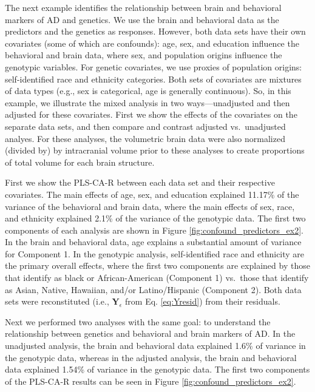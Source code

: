 \documentclass[12pt]{article}
\begin{document}
The next example identifies the relationship between brain and
behavioral markers of AD and genetics. We use the brain and behavioral
data as the predictors and the genetics as responses. However, both data
sets have their own covariates (some of which are confounds): age, sex,
and education influence the behavioral and brain data, where sex, and
population origins influence the genotypic variables. For genetic
covariates, we use proxies of population origins: self-identified race
and ethnicity categories. Both sets of covariates are mixtures of data
types (e.g., sex is categorical, age is generally continuous). So, in
this example, we illustrate the mixed analysis in two ways---unadjusted
and then adjusted for these covariates. First we show the effects of the
covariates on the separate data sets, and then compare and contrast
adjusted vs.~unadjusted analyes. For these analyses, the volumetric
brain data were also normalized (divided by) by intracranial volume
prior to these analyses to create proportions of total volume for each
brain structure.

First we show the PLS-CA-R between each data set and their respective
covariates. The main effects of age, sex, and education explained
11.17\% of the variance of the behavioral and brain data, where the main
effects of sex, race, and ethnicity explained 2.1\% of the variance of
the genotypic data. The first two components of each analysis are shown
in Figure \ref{fig:confound_predictors_ex2}. In the brain and behavioral
data, age explains a substantial amount of variance for Component 1. In
the genotypic analysis, self-identified race and ethnicity are the
primary overall effects, where the first two components are explained by
those that identify as black or African-American (Component 1) vs.~those
that identify as Asian, Native, Hawaiian, and/or Latino/Hispanic
(Component 2). Both data sets were reconstituted (i.e.,
\({\mathbf Y}_{\epsilon}\) from Eq. \ref{eq:Yresid}) from their
residuals.

Next we performed two analyses with the same goal: to understand the
relationship between genetics and behavioral and brain markers of AD. In
the unadjusted analysis, the brain and behavioral data explained 1.6\%
of variance in the genotypic data, whereas in the adjusted analysis, the
brain and behavioral data explained 1.54\% of variance in the genotypic
data. The first two components of the PLS-CA-R results can be seen in
Figure \ref{fig:confound_predictors_ex2}.
\end{document}
